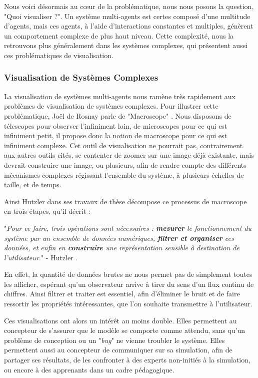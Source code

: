 		Nous voici désormais au cœur de la problématique, nous nous posons la question, "Quoi visualiser ?". Un système multi-agents est certes composé d'une multitude d'agents, mais ces agents, à l'aide d'interactions constantes et multiples, génèrent un comportement complexe de plus haut niveau. Cette complexité, nous la retrouvons plus généralement dans les systèmes complexes, qui présentent aussi ces problématiques de visualisation.
		
		\subsubsection{Visualisation de Systèmes Complexes}
		\label{sectionVisuComplexe}
		
		La visualisation de systèmes multi-agents nous ramène très rapidement aux problèmes de visualisation de systèmes complexes. Pour illustrer cette problématique, Joël de Rosnay parle de "Macroscope" \cite{de_rosnay_macroscope_1975}. Nous disposons de télescopes pour observer l'infiniment loin, de microscopes pour ce qui est infiniment petit, il propose donc la notion de macroscope pour ce qui est infiniment complexe. Cet outil de visualisation ne pourrait pas, contrairement aux autres outils cités, se contenter de zoomer sur une image déjà existante, mais devrait construire une image, ou plusieurs, afin de rendre compte des différents mécanismes complexes régissant l'ensemble du système, à plusieurs échelles de taille, et de temps.
		
		Ainsi Hutzler dans ses travaux de thèse \cite{hutzler_du_2000} décompose ce processus de macroscope en trois étapes, qu'il décrit :
		
		"\textit{Pour ce faire, trois opérations sont nécessaires : \textbf{mesurer} le fonctionnement du système par un ensemble de données numériques, \textbf{filtrer et organiser} ces données, et enfin en \textbf{construire} une représentation sensible à destination de l'utilisateur.}" - Hutzler \cite{hutzler_du_2000}.

	En effet, la quantité de données brutes ne nous permet pas de simplement toutes les afficher, espérant qu'un observateur arrive à tirer du sens d'un flux continu de chiffres. Ainsi filtrer et traiter est essentiel, afin d'éliminer le bruit et de faire ressortir les propriétés intéressantes, que l'on souhaite transmettre à l'utilisateur.

		
		 Ces visualisations ont alors un intérêt au moins double. Elles permettent au concepteur de s'assurer que le modèle se comporte comme attendu, sans qu'un problème de conception ou un "\textit{bug}" ne vienne troubler le système. Elles permettent aussi au concepteur de communiquer sur sa simulation, afin de partager ses résultats, de les confronter à des experts non-initiés à la simulation, ou encore à des apprenants dans un cadre pédagogique.

